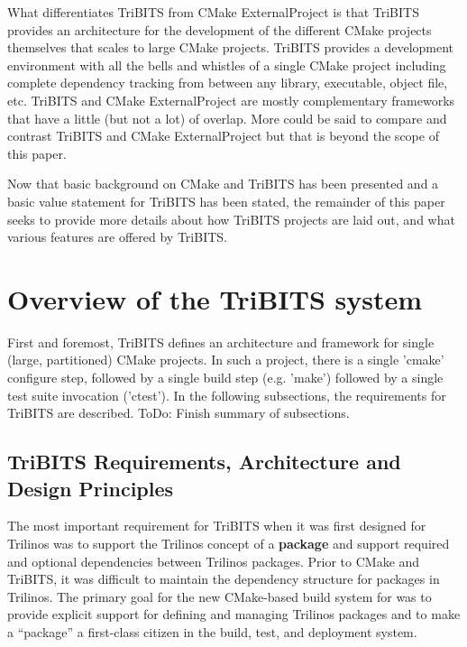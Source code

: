 \documentclass[note]{TechNote}
\begin{document}
What differentiates TriBITS from CMake ExternalProject is that TriBITS provides an architecture for the development of the different CMake projects themselves that scales to large CMake projects.  TriBITS provides a development environment with all the bells and whistles of a single CMake project including complete dependency tracking from between any library, executable, object file, etc.  TriBITS and CMake ExternalProject are mostly complementary frameworks that have a little (but not a lot) of overlap.  More could be said to compare and contrast TriBITS and CMake ExternalProject but that is beyond the scope of this paper.

Now that basic background on CMake and TriBITS has been presented and a basic value statement for TriBITS has been stated, the remainder of this paper seeks to provide more details about how TriBITS projects are laid out, and what various features are offered by TriBITS.

%
\section{Overview of the TriBITS system}
%

First and foremost, TriBITS defines an architecture and framework for single (large, partitioned) CMake projects.  In such a project, there is a single 'cmake' configure step, followed by a single build step (e.g. 'make') followed by a single test suite invocation ('ctest').  In the following subsections, the requirements for TriBITS are described.  ToDo: Finish summary of subsections.

%
\subsection{TriBITS Requirements, Architecture and Design Principles}
%

The most important requirement for TriBITS when it was first designed for Trilinos was to support the Trilinos concept of a \textbf{package} and support required and optional dependencies between Trilinos packages.  Prior to CMake and TriBITS, it was difficult to maintain the dependency structure for packages in Trilinos.  The primary goal for the new CMake-based build system for was to provide explicit support for defining and managing Trilinos packages and to make a ``package'' a first-class citizen in the build, test, and deployment system.
\end{document}

